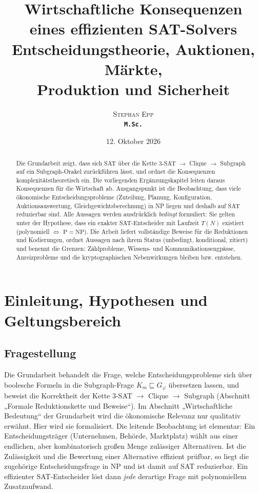\documentclass[a4paper,12pt]{article}
\title{\textbf{Wirtschaftliche Konsequenzen eines effizienten SAT-Solvers}\\[0.4em]
\Large Entscheidungstheorie, Auktionen, Märkte,\\Produktion und Sicherheit}
\author{\textsc{Stephan Epp}\\ {\small \texttt{\textbf{M.Sc.}}}}
\date{12. Oktober 2026}
\theoremstyle{definition}
\newcommand{\cP}{\ensuremath{\mathrm{P}}}
\newcommand{\cNP}{\ensuremath{\mathrm{NP}}}
\begin{document}
\maketitle

\begin{abstract}
\noindent Die Grundarbeit zeigt, dass sich SAT über die Kette 3-SAT $\to$ Clique $\to$ Subgraph auf ein Subgraph-Orakel zurückführen lässt, und ordnet die Konsequenzen komplexitätstheoretisch ein. Die vorliegenden Ergänzungskapitel leiten daraus Konsequenzen für die Wirtschaft ab. Ausgangspunkt ist die Beobachtung, dass viele ökonomische Entscheidungsprobleme (Zuteilung, Planung, Konfiguration, Auktionsauswertung, Gleichgewichtsberechnung) in NP liegen und deshalb auf SAT reduzierbar sind. Alle Aussagen werden ausdrücklich \emph{bedingt} formuliert: Sie gelten unter der Hypothese, dass ein exakter SAT-Entscheider mit Laufzeit $T(N)$ existiert (polynomiell $\Leftrightarrow$ $\cP=\cNP$). Die Arbeit liefert vollständige Beweise für die Reduktionen und Kodierungen, ordnet Aussagen nach ihrem Status (unbedingt, konditional, zitiert) und benennt die Grenzen: Zählprobleme, Wissens- und Kommunikationsengpässe, Anreizprobleme und die kryptographischen Nebenwirkungen bleiben bzw. entstehen.
\end{abstract}

\tableofcontents
\newpage


\section{Einleitung, Hypothesen und Geltungsbereich}
\label{eco:intro}

\subsection{Fragestellung}
Die Grundarbeit behandelt die Frage, welche Entscheidungsprobleme sich über boolesche Formeln in die Subgraph-Frage \(K_m \sqsubseteq G_\varphi\) übersetzen lassen, und beweist die Korrektheit der Kette 3-SAT \(\to\) Clique \(\to\) Subgraph (Abschnitt „Formale Reduktionskette und Beweise“). Im Abschnitt „Wirtschaftliche Bedeutung“ der Grundarbeit wird die ökonomische Relevanz nur qualitativ erwähnt. Hier wird sie formalisiert. Die leitende Beobachtung ist elementar: Ein Entscheidungsträger (Unternehmen, Behörde, Marktplatz) wählt aus einer endlichen, aber kombinatorisch großen Menge zulässiger Alternativen. Ist die Zulässigkeit und die Bewertung einer Alternative effizient prüfbar, so liegt die zugehörige Entscheidungsfrage in NP und ist damit auf SAT reduzierbar. Ein effizienter SAT-Entscheider löst dann \emph{jede} derartige Frage mit polynomiellem Zusatzaufwand.
\end{document}
